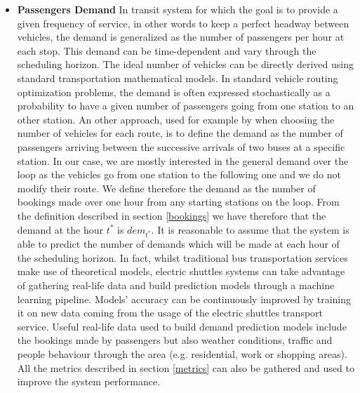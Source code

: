 \documentclass[12pt,a4paper]{article}
\begin{document}
\begin{itemize}
\setlength\itemsep{1pt}
\item \textbf{Passengers Demand} In transit system for which the goal is to provide a given frequency of service, in other words to keep a perfect headway between vehicles, the demand is generalized as the number of passengers per hour at each stop. This demand can be time-dependent and vary through the scheduling horizon. The ideal number of vehicles can be directly derived using standard transportation mathematical models. In standard vehicle routing optimization problems, the demand is often expressed stochastically as a probability to have a given number of passengers going from one station to an other station. An other approach, used for example by \cite{ga} when choosing the number of vehicles for each route, is to define the demand as the number of passengers arriving between the successive arrivals of two buses at a specific station. In our case, we are mostly interested in the general demand over the loop as the vehicles go from one station to the following one and we do not modify their route. We define therefore the demand as the number of bookings made over one hour from any starting stations on the loop. From the definition described in section \ref{bookings} we have therefore that the demand at the hour $t^{*}$ is $dem_{t^{*}}$. It is reasonable to assume that the system is able to predict the number of demands which will be made at each hour of the scheduling horizon. In fact, whilst traditional bus transportation services make use of theoretical models, electric shuttles systems can take advantage of gathering real-life data and build prediction models through a machine learning pipeline. Models' accuracy can be continuously improved by training it on new data coming from the usage of the electric shuttles transport service. Useful real-life data used to build demand prediction models include the bookings made by passengers but also weather conditions, traffic and people behaviour through the area (e.g. residential, work or shopping areas). All the metrics described in section \ref{metrics} can also be gathered and used to improve the system performance.

\end{itemize}
\end{document}
